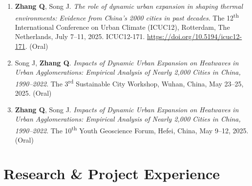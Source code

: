 \documentclass[10pt,a4paper]{article}
\begin{document}
\begin{enumerate}[leftmargin=22pt]
    \item \textbf{Zhang Q}, Song J. \textit{The role of dynamic urban expansion in shaping thermal environments: Evidence from China's 2000 cities in past decades}. The 12\textsuperscript{th} International Conference on Urban Climate (ICUC12), Rotterdam, The Netherlands, July 7--11, 2025. ICUC12-171. \url{https://doi.org/10.5194/icuc12-171}. (Oral)

    \item Song J, \textbf{Zhang Q}. \textit{Impacts of Dynamic Urban Expansion on Heatwaves in Urban Agglomerations: Empirical Analysis of Nearly 2,000 Cities in China, 1990--2022}. The 3\textsuperscript{rd} Sustainable City Workshop, Wuhan, China, May 23--25, 2025. (Oral)

    \item \textbf{Zhang Q}, Song J. \textit{Impacts of Dynamic Urban Expansion on Heatwaves in Urban Agglomerations: Empirical Analysis of Nearly 2,000 Cities in China, 1990--2022}. The 10\textsuperscript{th} Youth Geoscience Forum, Hefei, China, May 9--12, 2025. (Oral)
\end{enumerate}

\section{Research \& Project Experience}
\end{document}
